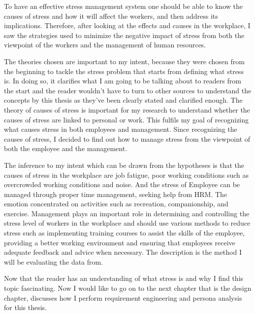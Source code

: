 To have an effective stress management system one should be able to know the causes of stress and how it will affect the workers, and then address its implications.  Therefore, after looking at the effects and causes in the workplace, I saw the strategies used to minimize the negative impact of stress from both the viewpoint of the workers and the management of human resources.

The theories chosen are important to my intent, because they were chosen from the beginning to tackle the stress problem that starts from defining what stress is. In doing so, it clarifies what I am going to be talking about to readers from the start and the reader wouldn't have to turn to other sources to understand the concepts by this thesis as they've been clearly stated and clarified enough.  The theory of causes of stress is important for my research to understand whether the causes of stress are linked to personal or work. This fulfils my goal of recognizing what causes stress in both employees and management. Since recognizing the causes of stress, I decided to find out how to manage stress from the viewpoint of both the employee and the management.

The inference to my intent which can be drawn from the hypotheses is that the causes of stress in the workplace are job fatigue, poor working conditions such as overcrowded working conditions and noise.  And the stress of Employee can be managed through proper time management, seeking help from \acs{HRM}. The emotion concentrated on activities such as recreation, companionship, and exercise. Management plays an important role in determining and controlling the stress level of workers in the workplace and should use various methods to reduce stress such as implementing training courses to assist the skills of the employee, providing a better working environment and ensuring that employees receive adequate feedback and advice when necessary. The description is the method I will be evaluating the data from.

Now that the reader has an understanding of what stress is and why I find this topic fascinating. Now I would like to go on to the next chapter that is the design chapter, discusses how I perform requirement engineering and persona analysis for this thesis.